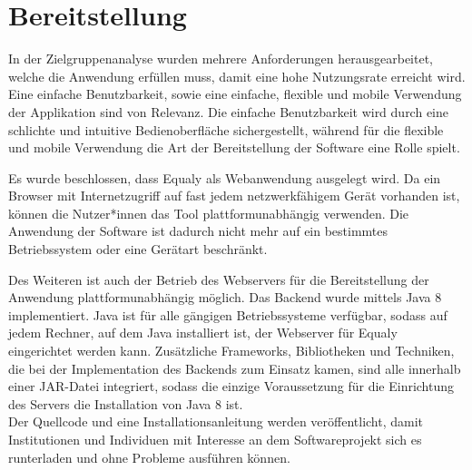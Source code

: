 \section{Bereitstellung}
\label{sec:bereitstellung}

In der Zielgruppenanalyse wurden mehrere Anforderungen herausgearbeitet, welche die Anwendung erfüllen muss, damit eine hohe Nutzungsrate erreicht wird. Eine einfache Benutzbarkeit, sowie eine einfache, flexible und mobile Verwendung der Applikation sind von Relevanz. Die einfache Benutzbarkeit wird durch eine schlichte und intuitive Bedienoberfläche sichergestellt, während für die flexible und mobile Verwendung die Art der Bereitstellung der Software eine Rolle spielt.

Es wurde beschlossen, dass Equaly als Webanwendung ausgelegt wird. Da ein Browser mit Internetzugriff auf fast jedem netzwerkfähigem Gerät vorhanden ist, können die Nutzer*innen das Tool plattformunabhängig verwenden. Die Anwendung der Software ist dadurch nicht mehr auf ein bestimmtes Betriebssystem oder eine Gerätart beschränkt.

Des Weiteren ist auch der Betrieb des Webservers für die Bereitstellung der Anwendung plattformunabhängig möglich. Das Backend wurde mittels Java 8 implementiert. Java ist für alle gängigen Betriebssysteme verfügbar, sodass auf jedem Rechner, auf dem Java installiert ist, der Webserver für Equaly eingerichtet werden kann. Zusätzliche Frameworks, Bibliotheken und Techniken, die bei der Implementation des Backends zum Einsatz kamen, sind alle innerhalb einer JAR-Datei integriert, sodass die einzige Voraussetzung für die Einrichtung des Servers die Installation von Java 8 ist. \\
Der Quellcode und eine Installationsanleitung werden veröffentlicht, damit Institutionen und Individuen mit Interesse an dem Softwareprojekt sich es runterladen und ohne Probleme ausführen können.

